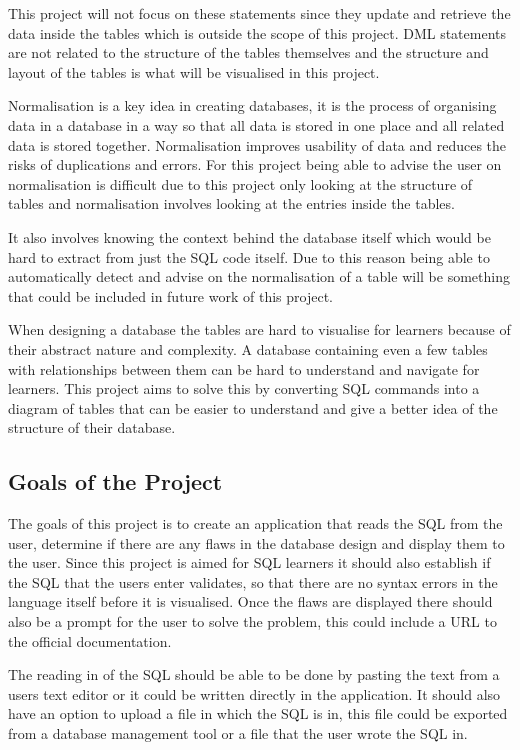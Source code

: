 This project will not focus on these statements since they update and retrieve the data inside the tables which is outside the scope of this project. DML statements are not related to the structure of the tables themselves and the structure and layout of the tables is what will be visualised in this project.

Normalisation is a key idea in creating databases, it is the process of organising data in a database in a way so that all data is stored in one place and all related data is stored together\cite{normalisation}. Normalisation improves usability of data and reduces the risks of duplications and errors. For this project being able to advise the user on normalisation is difficult due to this project only looking at the structure of tables and normalisation involves looking at the entries inside the tables. 

It also involves knowing the context behind the database itself which would be hard to extract from just the SQL code itself. Due to this reason being able to automatically detect and advise on the normalisation of a table will be something that could be included in future work of this project.

When designing a database the tables are hard to visualise for learners because of their abstract nature and complexity. A database containing even a few tables with relationships between them can be hard to understand and navigate for learners. This project aims to solve this by converting SQL commands into a diagram of tables that can be easier to understand and give a better idea of the structure of their database.

\subsection{Goals of the Project}

The goals of this project is to create an application that reads the SQL from the user, determine if there are any flaws in the database design and display them to the user. Since this project is aimed for SQL learners it should also establish if the SQL that the users enter validates, so that there are no syntax errors in the language itself before it is visualised. Once the flaws are displayed there should also be a prompt for the user to solve the problem, this could include a URL to the official documentation. 

The reading in of the SQL should be able to be done by pasting the text from a users text editor or it could be written directly in the application. It should also have an option to upload a file in which the SQL is in, this file could be exported from a database management tool or a file that the user wrote the SQL in.

